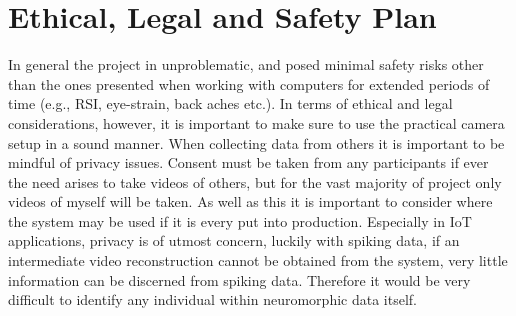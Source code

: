 \chapter{Ethical, Legal and Safety Plan}

In general the project in unproblematic, and posed minimal safety risks other than the ones presented when working with computers for extended periods of time (e.g., RSI, eye-strain, back aches etc.). In terms of ethical and legal considerations, however, it is important to make sure to use the practical camera setup in a sound manner. When collecting data from others it is important to be mindful of privacy issues. Consent must be taken from any participants if ever the need arises to take videos of others, but for the vast majority of project only videos of myself will be taken. As well as this it is important to consider where the system may be used if it is every put into production. Especially in IoT applications, privacy is of utmost concern, luckily with spiking data, if an intermediate video reconstruction cannot be obtained from the system, very little information can be discerned from spiking data. Therefore it would be very difficult to identify any individual within neuromorphic data itself.